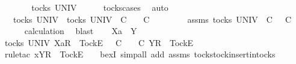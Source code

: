 \begin{isabellebody}
\ \ \isamarkupfalse%
\ \isamarkupfalse%
\ {\isachardoublequoteopen}{\isasymrho}\ {\isasymin}\ tocks\ UNIV{\isachardoublequoteclose}\isanewline
\ \ \ \ \isamarkupfalse%
\ tocks{\isachardot}cases\ \isamarkupfalse%
\ auto\isanewline
\ \ \isamarkupfalse%
\ \isamarkupfalse%
\ {\isachardoublequoteopen}{\isasymrho}\ {\isasymin}\ tocks\ UNIV\ {\isasymLongrightarrow}\ {\isasymexists}{\isasymrho}{\isacharprime}{\isasymin}tocks\ UNIV{\isachardot}\ {\isasymrho}\ {\isasymlesssim}\isactrlsub C\ {\isasymrho}{\isacharprime}\ {\isasymand}\ {\isasymrho}{\isacharprime}\ {\isasymle}\isactrlsub C\ {\isasymsigma}{\isachardoublequoteclose}\isanewline
\ \ \isamarkupfalse%
\ \isamarkupfalse%
\ {\isasymrho}{\isacharprime}\ \ {\isasymrho}{\isacharprime}{\isacharunderscore}assms{\isacharcolon}\ {\isachardoublequoteopen}{\isasymrho}{\isacharprime}{\isasymin}tocks\ UNIV{\isachardoublequoteclose}\ {\isachardoublequoteopen}{\isasymrho}\ {\isasymlesssim}\isactrlsub C\ {\isasymrho}{\isacharprime}{\isachardoublequoteclose}\ {\isachardoublequoteopen}{\isasymrho}{\isacharprime}\ {\isasymle}\isactrlsub C\ {\isasymsigma}{\isachardoublequoteclose}\isanewline
\ \ \ \ \isamarkupfalse%
\ calculation\ \isamarkupfalse%
\ blast\isanewline
\ \ \isamarkupfalse%
\ {\isachardoublequoteopen}Xa\ {\isasymsubseteq}\ Y{\isachardoublequoteclose}\isanewline
\ \ \isamarkupfalse%
\ \isamarkupfalse%
\ {\isachardoublequoteopen}{\isasymexists}{\isasymrho}{\isacharprime}{\isasymin}tocks\ UNIV{\isachardot}\ {\isacharbrackleft}Xa{\isacharbrackright}\isactrlsub R\ {\isacharhash}\ {\isacharbrackleft}Tock{\isacharbrackright}\isactrlsub E\ {\isacharhash}\ {\isasymrho}\ {\isasymlesssim}\isactrlsub C\ {\isasymrho}{\isacharprime}\ {\isasymand}\ {\isasymrho}{\isacharprime}\ {\isasymle}\isactrlsub C\ {\isacharbrackleft}Y{\isacharbrackright}\isactrlsub R\ {\isacharhash}\ {\isacharbrackleft}Tock{\isacharbrackright}\isactrlsub E\ {\isacharhash}\ {\isasymsigma}{\isachardoublequoteclose}\isanewline
\ \ \ \ \isamarkupfalse%
\ {\isacharparenleft}rule{\isacharunderscore}tac\ x{\isacharequal}{\isachardoublequoteopen}{\isacharbrackleft}Y{\isacharbrackright}\isactrlsub R\ {\isacharhash}\ {\isacharbrackleft}Tock{\isacharbrackright}\isactrlsub E\ {\isacharhash}\ {\isasymrho}{\isacharprime}{\isachardoublequoteclose}\ \ bexI{\isacharcomma}\ simp{\isacharunderscore}all\ add{\isacharcolon}\ {\isasymrho}{\isacharprime}{\isacharunderscore}assms\ tocks{\isachardot}tock{\isacharunderscore}insert{\isacharunderscore}in{\isacharunderscore}tocks{\isacharparenright}\isanewline

\end{isabellebody}
